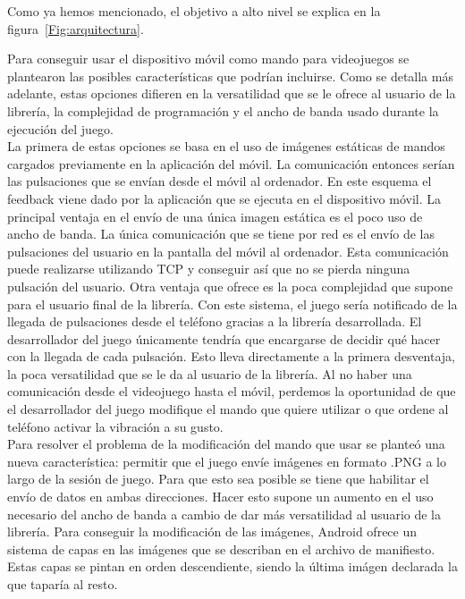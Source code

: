 Como ya hemos mencionado, el objetivo a alto nivel se explica en la figura~\ref{Fig:arquitectura}. 

Para conseguir usar el dispositivo m\'ovil como mando para videojuegos se plantearon las posibles caracter\'isticas que podr\'ian incluirse. Como se detalla m\'as adelante, estas opciones difieren en la versatilidad que se le ofrece al usuario de la librer\'ia, la complejidad de programaci\'on y el ancho de banda usado durante la ejecuci\'on del juego. \\

La primera de estas opciones se basa en el uso de im\'agenes est\'aticas de mandos cargados previamente en la aplicaci\'on del m\'ovil. La comunicaci\'on entonces ser\'ian las pulsaciones que se env\'ian desde el m\'ovil al ordenador.  En este esquema el feedback viene dado por la aplicaci\'on que se ejecuta en el dispositivo m\'ovil. La principal ventaja en el env\'io de una \'unica imagen est\'atica es el poco uso de ancho de banda. La \'unica comunicaci\'on que se tiene por red es el env\'io de las pulsaciones del usuario en la pantalla del m\'ovil al ordenador. Esta comunicaci\'on puede realizarse utilizando TCP y conseguir as\'i que no se pierda ninguna pulsaci\'on del usuario. Otra ventaja que ofrece es la poca complejidad que supone para el usuario final de la librer\'ia. Con este sistema, el juego ser\'ia notificado de la llegada de pulsaciones desde el tel\'efono gracias a la librer\'ia desarrollada. El desarrollador del juego \'unicamente tendr\'ia que encargarse de decidir qu\'e hacer con la llegada de cada pulsaci\'on. Esto lleva directamente a la primera desventaja, la poca versatilidad que se le da al usuario de la librer\'ia. Al no haber una comunicaci\'on desde el videojuego hasta el m\'ovil, perdemos la oportunidad de que el desarrollador del juego modifique el mando que quiere utilizar o que ordene al tel\'efono activar la vibraci\'on a su gusto.\\

Para resolver el problema de la modificaci\'on del mando que usar se plante\'o una nueva caracter\'istica: permitir que el juego env\'ie im\'agenes en formato .PNG a lo largo de la sesi\'on de juego. Para que esto sea posible se tiene que habilitar el env\'io de datos en ambas direcciones. Hacer esto supone un aumento en el uso necesario del ancho de banda a cambio de dar m\'as versatilidad al usuario de la librer\'ia. Para conseguir la modificaci\'on de las im\'agenes, Android ofrece un sistema de capas en las im\'agenes que se describan en el archivo de manifiesto. Estas capas se pintan en orden descendiente, siendo la \'ultima im\'agen declarada la que tapar\'ia al resto. 

